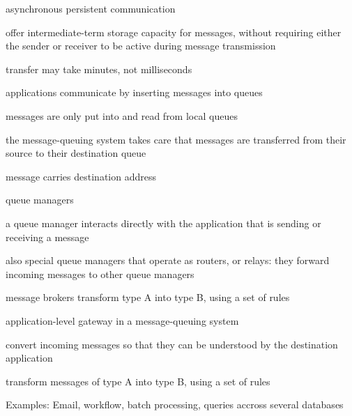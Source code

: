 \documentclass[ngerman,a4paper]{report}
\begin{document}
\begin{compactitem}
	\item asynchronous persistent communication
	\item offer intermediate-term storage capacity for messages, without requiring either the sender or receiver to be active during message transmission
	\item transfer may take minutes, not milliseconds
	\item applications communicate by inserting messages into queues
	\item messages are only put into and read from local queues
	\item the message-queuing system takes care that messages are transferred from their source to their destination queue	
	\item message carries destination address
	\item queue managers
	\begin{compactitem}
		\item a queue manager interacts directly with the application that is sending or receiving a message
		\item also special queue managers that operate as routers, or relays: they forward incoming messages to other queue managers
	\end{compactitem}
	\item message brokers transform type A into type B, using a set of rules
		\begin{compactitem}
		\item application-level gateway in a message-queuing system
		\item convert incoming messages so that they can be understood by the destination application		
		\item transform messages of type A into type B, using a set of rules
	\end{compactitem}
	\item Examples: Email, workflow, batch processing, queries accross several databases
\end{compactitem}
\end{document}
